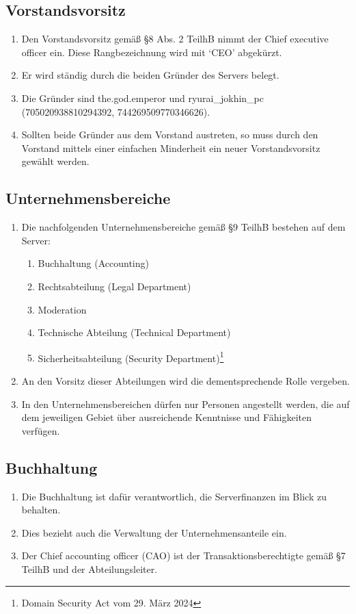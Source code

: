 \documentclass{article}
\begin{document}
\subsection{Vorstandsvorsitz}
\begin{enumerate}[(1)]
	\item Den Vorstandsvorsitz gemäß §8 Abs. 2 TeilhB nimmt der Chief executive officer ein. Diese Rangbezeichnung wird mit `CEO' abgekürzt.
	\item Er wird ständig durch die beiden Gründer des Servers belegt.
	\item Die Gründer sind the.god.emperor und ryurai\_jokhin\_pc (705020938810294392, 744269509770346626).
	\item Sollten beide Gründer aus dem Vorstand austreten, so muss durch den Vorstand mittels einer einfachen Minderheit ein neuer Vorstandsvorsitz gewählt werden.
\end{enumerate}

\subsection{Unternehmensbereiche}
\begin{enumerate}[(1)]
	\item Die nachfolgenden Unternehmensbereiche gemäß §9 TeilhB bestehen auf dem Server:
		\begin{enumerate}[1.]
			\item Buchhaltung (Accounting)
			\item Rechtsabteilung (Legal Department)
			\item Moderation
			\item Technische Abteilung (Technical Department)
			\item Sicherheitsabteilung (Security Department)\footnote{Domain Security Act vom 29. März 2024}
		\end{enumerate}
	\item An den Vorsitz dieser Abteilungen wird die dementsprechende Rolle vergeben.
	\item In den Unternehmensbereichen dürfen nur Personen angestellt werden, die auf dem jeweiligen Gebiet über ausreichende Kenntnisse und Fähigkeiten verfügen.
\end{enumerate}

\subsection{Buchhaltung}
\begin{enumerate}[(1)]
	\item Die Buchhaltung ist dafür verantwortlich, die Serverfinanzen im Blick zu behalten.
	\item Dies bezieht auch die Verwaltung der Unternehmensanteile ein.
	\item Der Chief accounting officer (CAO) ist der Transaktionsberechtigte gemäß §7 TeilhB und der Abteilungsleiter.
\end{enumerate}
\end{document}
